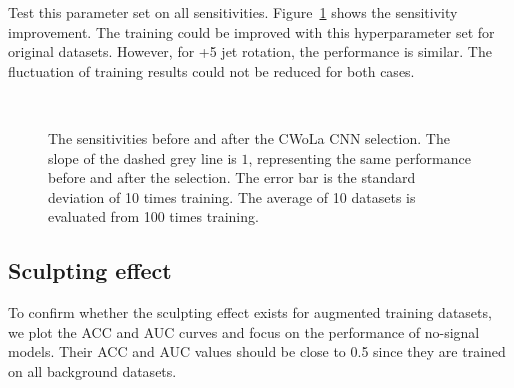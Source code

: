 \documentclass[12pt]{article}
\begin{document}
        Test this parameter set on all sensitivities. Figure~\ref{fig:sensitivity_improvement_best_hp_res_25} shows the sensitivity improvement. The training could be improved with this hyperparameter set for original datasets. However, for +5 jet rotation, the performance is similar. The fluctuation of training results could not be reduced for both cases.
        \begin{figure}[htpb]
            \centering
             \\
            \caption{The sensitivities before and after the CWoLa CNN selection. The slope of the dashed grey line is $1$, representing the same performance before and after the selection. The error bar is the standard deviation of 10 times training. The average of 10 datasets is evaluated from 100 times training.}
            \label{fig:sensitivity_improvement_best_hp_res_25}
        \end{figure}
    \subsection{Sculpting effect}%
    \label{sub:sculpting_effect}
        To confirm whether the sculpting effect exists for augmented training datasets, we plot the ACC and AUC curves and focus on the performance of no-signal models. Their ACC and AUC values should be close to 0.5 since they are trained on all background datasets.
\end{document}
